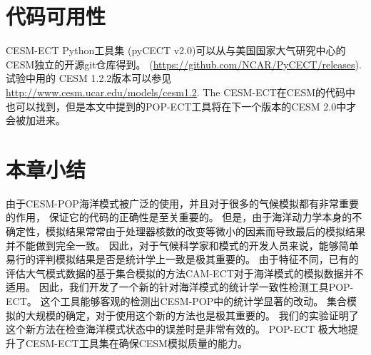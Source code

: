 \section{代码可用性}\label{verify:code}

CESM-ECT Python工具集 (pyCECT v2.0)可以从与美国国家大气研究中心的CESM独立的开源git仓库得到。 (\url{https://github.com/NCAR/PyCECT/releases}).  试验中用的 CESM 1.2.2版本可以参见\url{http://www.cesm.ucar.edu/models/cesm1.2}. The CESM-ECT在CESM的代码中也可以找到，但是本文中提到的POP-ECT工具将在下一个版本的CESM 2.0中才会被加进来。 

\section{本章小结}
\label{verify:Conclusion}

由于CESM-POP海洋模式被广泛的使用，并且对于很多的气候模拟都有非常重要的作用，
保证它的代码的正确性是至关重要的。 
但是，由于海洋动力学本身的不确定性，模拟结果常常由于处理器核数的改变等微小的因素而导致最后的模拟结果并不能做到完全一致。
因此，对于气候科学家和模式的开发人员来说，能够简单易行的评判模拟结果是否是统计学上一致是极其重要的。
由于特征不同，已有的评估大气模式数据的基于集合模拟的方法CAM-ECT对于海洋模式的模拟数据并不适用。 
因此，我们开发了一个新的针对海洋模式的统计学一致性检测工具POP-ECT。
这个工具能够客观的检测出CESM-POP中的统计学显著的改动。 
集合模拟的大规模的确定，对于使用这个新的方法也是极其重要的。
我们的实验证明了这个新方法在检查海洋模式状态中的误差时是非常有效的。 
POP-ECT 极大地提升了CESM-ECT工具集在确保CESM模拟质量的能力。



